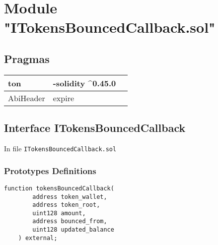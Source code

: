 
\section{Module "ITokensBouncedCallback.sol"}


\subsection{Pragmas}


\noindent\begin{tabular}{|l|l|p{5cm}|}\hline
ton & -solidity \^{}0.45.0 &\\\hline
AbiHeader &  expire &\\\hline
\end{tabular}


\subsection{Interface ITokensBouncedCallback}


In file {\tt ITokensBouncedCallback.sol}

\subsubsection{Prototypes Definitions}

\vspace{2cm}

\begin{lstlisting}[firstnumber=5]
    function tokensBouncedCallback(
        address token_wallet,
        address token_root,
        uint128 amount,
        address bounced_from,
        uint128 updated_balance
    ) external;
\end{lstlisting}
